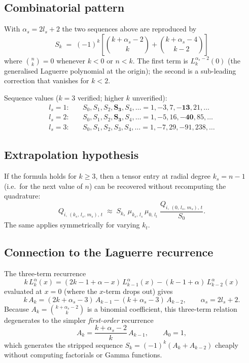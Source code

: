 \documentclass{article}
\begin{document}
\subsection*{Combinatorial pattern}

With $\alpha_s = 2l_s + 2$ the two sequences above are reproduced by
\[
  \boxed{S_k \;=\; (-1)^k\left[\binom{k+\alpha_s-2}{k}
                              + \binom{k+\alpha_s-4}{k-2}\right]}
\]
where $\binom{n}{k}=0$ whenever $k<0$ or $n<k$.
The first term is $L_k^{\alpha_s-2}(0)$ (the generalised Laguerre polynomial
at the origin); the second is a sub-leading correction that vanishes for
$k<2$.

Sequence values ($k=3$ verified; higher $k$ unverified):
\begin{align*}
  l_s = 1: &\quad S_0,S_1,S_2,\mathbf{S_3},S_4,\ldots
             = 1,-3,7,\mathbf{-13},21,\ldots \\
  l_s = 2: &\quad S_0,S_1,S_2,\mathbf{S_3},S_4,\ldots
             = 1,-5,16,\mathbf{-40},85,\ldots \\
  l_s = 3: &\quad S_0,S_1,S_2,S_3,S_4,\ldots
             = 1,-7,29,-91,238,\ldots
\end{align*}

\subsection*{Extrapolation hypothesis}

If the formula holds for $k\geq 3$, then a tensor entry at radial degree
$k_s = n-1$ (i.e.\ for the next value of $n$) can be recovered without
recomputing the quadrature:
\[
  Q_{i,\,(k_s,\,l_s,\,m_s),\,t}
  \;\approx\;
  S_{k_s}\;\mu_{k_s,\,l_s}\,\mu_{0,\,l_t}
  \;\frac{Q_{i,\,(0,\,l_s,\,m_s),\,t}}{S_0}.
\]
The same applies symmetrically for varying $k_t$.

\subsection*{Connection to the Laguerre recurrence}

The three-term recurrence
\[
  k\,L_k^\alpha(x) = (2k-1+\alpha-x)\,L_{k-1}^\alpha(x)
                   - (k-1+\alpha)\,L_{k-2}^\alpha(x)
\]
evaluated at $x=0$ (where the $x$-term drops out) gives
\[
  k\,A_k = (2k+\alpha_s-3)\,A_{k-1} - (k+\alpha_s-3)\,A_{k-2},
  \qquad \alpha_s = 2l_s+2.
\]
Because $A_k = \binom{k+\alpha_s-2}{k}$ is a binomial coefficient,
this three-term relation degenerates to the simpler \emph{first-order} recurrence
\[
  A_k = \frac{k+\alpha_s-2}{k}\,A_{k-1}, \qquad A_0 = 1,
\]
which generates the stripped sequence $S_k = (-1)^k(A_k + A_{k-2})$ cheaply
without computing factorials or Gamma functions.
\end{document}
